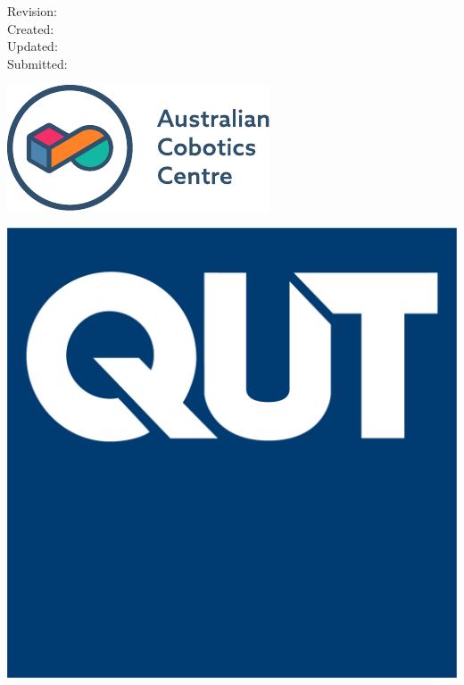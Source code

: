 \makeatletter %
\begin{titlepage}
    \begin{flushright}

        \ifdefined\technotedetails
            \large{\textbf{\technotedetails}}
        \fi
        \vspace*{4cm}

        \huge{\textbf{\@title}}
        \vspace*{2cm} 

        \small{\@author}
        \vspace{2cm} 

        \small{Revision: \revision} \\
        \small{Created: \@date} \\
        \ifdefined\daterevised
            \small{Updated: \daterevised} \\
        \fi
        \ifdefined\datesubmitted
            \small{Submitted: \datesubmitted}
        \fi
        \vfill

        \begin{minipage}{.5\textwidth}
          \centering
          \includegraphics[width=1.0\linewidth]{Images/acc-logo.pdf}
        \end{minipage}%
        \begin{minipage}{.4\textwidth}
          \centering
          \includegraphics[width=.6\linewidth]{Images/qut-logo.jpg}
        \end{minipage}


\end{flushright}
\end{titlepage}

